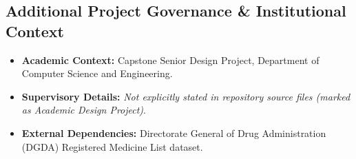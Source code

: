\documentclass[10pt,a4paper]{article}
\begin{document}
\subsection*{Additional Project Governance \& Institutional Context}
\begin{itemize}[leftmargin=*]
    \item \textbf{Academic Context:} Capstone Senior Design Project, Department of Computer Science and Engineering.
    \item \textbf{Supervisory Details:} \textit{Not explicitly stated in repository source files (marked as Academic Design Project)}.
    \item \textbf{External Dependencies:} Directorate General of Drug Administration (DGDA) Registered Medicine List dataset.
\end{itemize}
\end{document}
